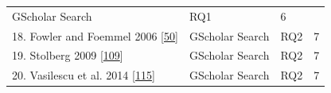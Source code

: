 \documentclass[]{book}
\begin{document}
\begin{longtable}[]{@{}llll@{}}
\begin{minipage}[t]{0.20\columnwidth}
GScholar Search\strut
\end{minipage} & \begin{minipage}[t]{0.14\columnwidth}\raggedright\strut
RQ1\strut
\end{minipage} & \begin{minipage}[t]{0.06\columnwidth}\raggedright\strut
6\strut
\end{minipage}\tabularnewline
\begin{minipage}[t]{0.48\columnwidth}\raggedright\strut
18. Fowler and Foemmel 2006
{[}\protect\hyperlink{ref-fowler2006continuous}{50}{]}\strut
\end{minipage} & \begin{minipage}[t]{0.20\columnwidth}\raggedright\strut
GScholar Search\strut
\end{minipage} & \begin{minipage}[t]{0.14\columnwidth}\raggedright\strut
RQ2\strut
\end{minipage} & \begin{minipage}[t]{0.06\columnwidth}\raggedright\strut
7\strut
\end{minipage}\tabularnewline
\begin{minipage}[t]{0.48\columnwidth}\raggedright\strut
19. Stolberg 2009
{[}\protect\hyperlink{ref-stolberg2009enabling}{109}{]}\strut
\end{minipage} & \begin{minipage}[t]{0.20\columnwidth}\raggedright\strut
GScholar Search\strut
\end{minipage} & \begin{minipage}[t]{0.14\columnwidth}\raggedright\strut
RQ2\strut
\end{minipage} & \begin{minipage}[t]{0.06\columnwidth}\raggedright\strut
7\strut
\end{minipage}\tabularnewline
\begin{minipage}[t]{0.48\columnwidth}\raggedright\strut
20. Vasilescu et al. 2014
{[}\protect\hyperlink{ref-vasilescu2014continuous}{115}{]}\strut
\end{minipage} & \begin{minipage}[t]{0.20\columnwidth}\raggedright\strut
GScholar Search\strut
\end{minipage} & \begin{minipage}[t]{0.14\columnwidth}\raggedright\strut
RQ2\strut
\end{minipage} & \begin{minipage}[t]{0.06\columnwidth}\raggedright\strut
7\strut
\end{minipage}\tabularnewline
\bottomrule
\end{longtable}
\end{document}

